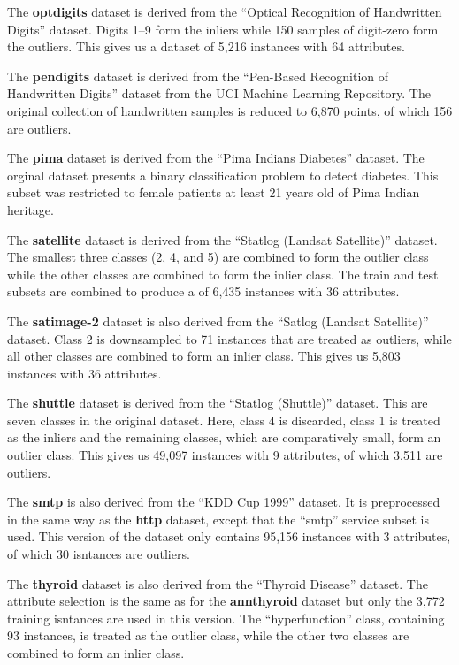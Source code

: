 The \textbf{optdigits} dataset is derived from the ``Optical Recognition of Handwritten Digits'' dataset.
Digits 1--9 form the inliers while 150 samples of digit-zero form the outliers.
This gives us a dataset of 5,216 instances with 64 attributes.

The \textbf{pendigits} dataset is derived from the ``Pen-Based Recognition of Handwritten Digits'' dataset from the UCI Machine Learning Repository.
The original collection of handwritten samples is reduced to 6,870 points, of which 156 are outliers.

The \textbf{pima} dataset is derived from the ``Pima Indians Diabetes'' dataset.
The orginal dataset presents a binary classification problem to detect diabetes.
This subset was restricted to female patients at least 21 years old of Pima Indian heritage.

The \textbf{satellite} dataset is derived from the ``Statlog (Landsat Satellite)'' dataset.
The smallest three classes (2, 4, and 5) are combined to form the outlier class while the other classes are combined to form the inlier class.
The train and test subsets are combined to produce a of 6,435 instances with 36 attributes.

The \textbf{satimage-2} dataset is also derived from the ``Satlog (Landsat Satellite)'' dataset.
Class 2 is downsampled to 71 instances that are treated as outliers, while all other classes are combined to form an inlier class.
This gives us 5,803 instances with 36 attributes.

The \textbf{shuttle} dataset is derived from the ``Statlog (Shuttle)'' dataset.
This are seven classes in the original dataset.
Here, class 4 is discarded, class 1 is treated as the inliers and the remaining classes, which are comparatively small, form an outlier class.
This gives us 49,097 instances with 9 attributes, of which 3,511 are outliers.

The \textbf{smtp} is also derived from the ``KDD Cup 1999'' dataset.
It is preprocessed in the same way as the \textbf{http} dataset, except that the ``smtp'' service subset is used.
This version of the dataset only contains 95,156 instances with 3 attributes, of which 30 isntances are outliers.

The \textbf{thyroid} dataset is also derived from the ``Thyroid Disease'' dataset.
The attribute selection is the same as for the \textbf{annthyroid} dataset but only the 3,772 training isntances are used in this version.
The ``hyperfunction'' class, containing 93 instances, is treated as the outlier class, while the other two classes are combined to form an inlier class.

